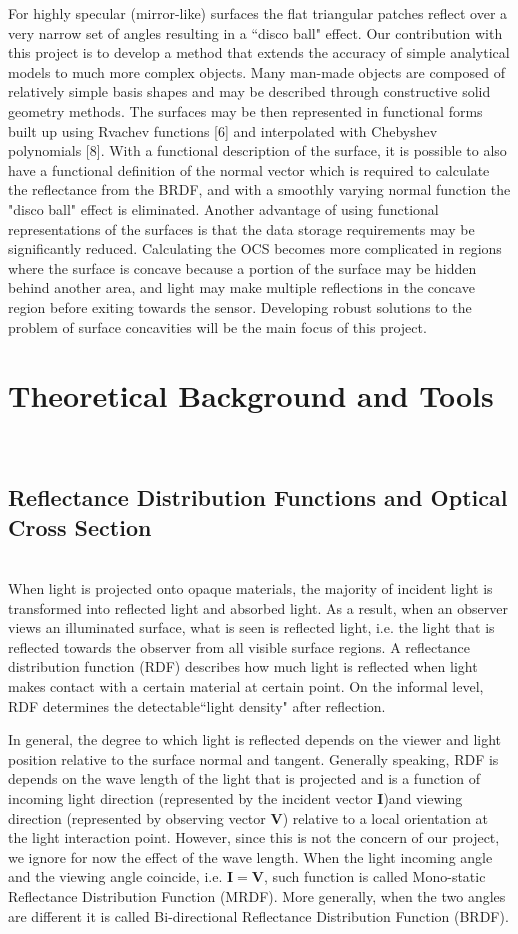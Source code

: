 \documentclass[11pt,reqno]{amsart}
\theoremstyle{definition}
\begin{document}
For highly specular (mirror-like) surfaces the flat triangular
patches reflect over a very narrow set of angles resulting in a ``disco ball" effect.
Our contribution with this project is to develop a method that extends the accuracy of simple analytical models to much more complex
objects. Many man-made objects are composed of relatively simple basis shapes and may be described through constructive
solid geometry methods. The surfaces may be then represented in functional forms built up using Rvachev functions [6] and interpolated with Chebyshev polynomials [8]. With a functional description of the surface, it is possible to also have a functional
definition of the normal vector which is required to calculate the reflectance from the BRDF, and with a smoothly varying
normal function the "disco ball" effect is eliminated. Another advantage of using functional representations of the surfaces
is that the data storage requirements may be significantly reduced. Calculating the OCS becomes more complicated in
regions where the surface is concave because a portion of the surface may be hidden behind another area, and light may
make multiple reflections in the concave region before exiting towards the sensor. Developing robust solutions to the
problem of surface concavities will be the main focus of this project.

\section{Theoretical Background and Tools}~\\
\subsection{Reflectance Distribution Functions and Optical Cross Section}~\\
When light is projected onto opaque materials, the majority of incident light is transformed into reflected light and absorbed light. As a result, when an observer views an illuminated surface, what is seen is reflected light, i.e. the light that is reflected towards the observer from all visible surface regions. A reflectance distribution function (RDF) describes how much light is reflected when light makes contact with a certain material at certain point. On the informal level, RDF determines the detectable``light density" after reflection. 

In general, the degree to which light is reflected depends on the viewer and
light position relative to the surface normal and tangent. Generally speaking, RDF is
depends on the wave length of the light that is projected and is a function of incoming light direction (represented by the incident vector
\textbf{I})and viewing direction (represented by observing vector \textbf{V})
relative to a local orientation at the light interaction point. However, since this is not the concern of our project, we ignore for now the effect of the wave length. When the light incoming angle and the viewing angle coincide, i.e. $\mathbf{I}=\mathbf{V}$, such function is called Mono-static Reflectance Distribution Function (MRDF). More generally, when the two angles are different it is called Bi-directional Reflectance Distribution Function (BRDF). 
\end{document}
